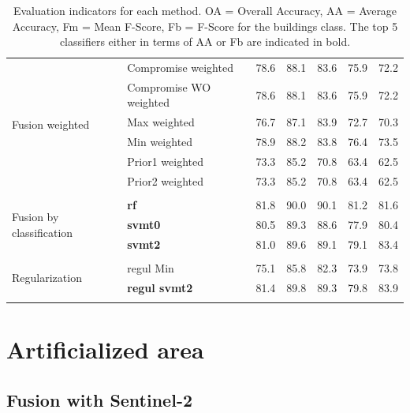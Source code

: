 \documentclass[10pt]{article}
\begin{document}
\begin{table}[H]
\begin{tabular}{p{1.8cm}llllll}
\multirow{6}{*}{\parbox{1.8cm}{Fusion weighted}}& Compromise weighted & 78.6 & 88.1 & 83.6 & 75.9 & 72.2 \\
& Compromise WO weighted & 78.6 & 88.1 & 83.6 & 75.9 & 72.2 \\
& Max weighted & 76.7 & 87.1 & 83.9 & 72.7 & 70.3 \\
& Min weighted & 78.9 & 88.2 & 83.8 & 76.4 & 73.5 \\
& Prior1 weighted & 73.3 & 85.2 & 70.8 & 63.4 & 62.5 \\
& Prior2 weighted & 73.3 & 85.2 & 70.8 & 63.4 & 62.5 \\\\\hline

\multirow{3}{*}{\parbox{1.8cm}{Fusion by classification}} & \textbf{rf} & 81.8 & 90.0 & 90.1 & 81.2 & 81.6 \\
&\textbf{svmt0} & 80.5 & 89.3 & 88.6 & 77.9 & 80.4 \\
&\textbf{svmt2} & 81.0 & 89.6 & 89.1 & 79.1 & 83.4 \\\\\hline
\multirow{2}{*}{Regularization} & regul Min & 75.1 & 85.8 & 82.3 & 73.9 & 73.8 \\
& \textbf{regul svmt2} & 81.4 & 89.8 & 89.3 & 79.8 & 83.9 \\ \\\bottomrule
\end{tabular}
\caption{Evaluation indicators for each method. OA = Overall Accuracy, AA = Average Accuracy, Fm = Mean F-Score, Fb = F-Score for the buildings class. The top 5 classifiers either in terms of AA or Fb are indicated in bold.}
\label{table:eval}
\end{table}

\section{Artificialized area}
\subsection{Fusion with Sentinel-2}
\end{document}

